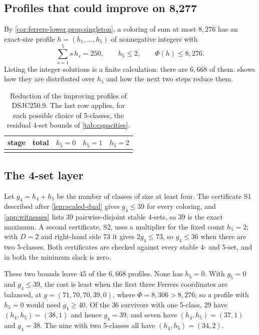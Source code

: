 \documentclass[11pt]{article}
\theoremstyle{definition}
\newcommand{\DSJCTwoFifty}{\textnormal{\textsc{DSJC250.9}}}
\begin{document}
\subsection{Profiles that could improve on 8,277}
\label{sec:profile-enumeration}

By \cref{cor:ferrers-lower,prop:singleton}, a coloring of sum at most
$8{,}276$ has an exact-size profile $h=(h_1,\ldots,h_5)$ of nonnegative
integers with
\begin{equation}
\label{eq:threshold-system}
  \sum_{s=1}^5 s\,h_s=250,\qquad h_5\le2,\qquad \Phi(h)\le8{,}276.
\end{equation}
Listing the integer solutions is a finite calculation: there are $6{,}668$ of
them.  shows how they are distributed over $h_5$
and how the next two steps reduce them.

\begin{table}[t]
\centering
\caption{Reduction of the improving profiles of \DSJCTwoFifty{}. The last
row applies, for each possible choice of 5-classes, the residual 4-set bounds
of \cref{tab:capacities}.}
\label{tab:profile-reduction}
\begin{tabular}{@{}lrrrr@{}}
\toprule
stage & total & $h_5=0$ & $h_5=1$ & $h_5=2$\\
\midrule
\tabularnewline
\bottomrule
\end{tabular}
\end{table}

\subsection{The 4-set layer}
\label{sec:fourth-layer}

Let $g_4=h_4+h_5$ be the number of classes of size at least four. The
certificate S1 described after \cref{lem:scaled-dual} gives $g_4\le39$ for
every coloring, and \cref{app:witnesses} lists $39$ pairwise-disjoint stable
4-sets, so $39$ is the exact maximum. A second certificate, S2, uses a
multiplier for the fixed count $h_5=2$; with $D=2$ and right-hand side $73$
it gives $2g_4\le73$, so $g_4\le36$ when there are two 5-classes. Both
certificates are checked against every stable 4- and 5-set, and in both the
minimum slack is zero.

These two bounds leave $45$ of the $6{,}668$ profiles. None has $h_5=0$. With
$g_5=0$ and $g_4\le39$, the cost is least when the first three Ferrers
coordinates are balanced, at $g=(71,70,70,39,0)$, where
$\Phi=8{,}306>8{,}276$; so a profile with $h_5=0$ would need $g_4\ge40$. Of
the $36$ survivors with one 5-class, $29$ have $(h_4,h_5)=(38,1)$ and hence
$g_4=39$, and seven have $(h_4,h_5)=(37,1)$ and $g_4=38$. The nine with two
5-classes all have $(h_4,h_5)=(34,2)$.
\end{document}
